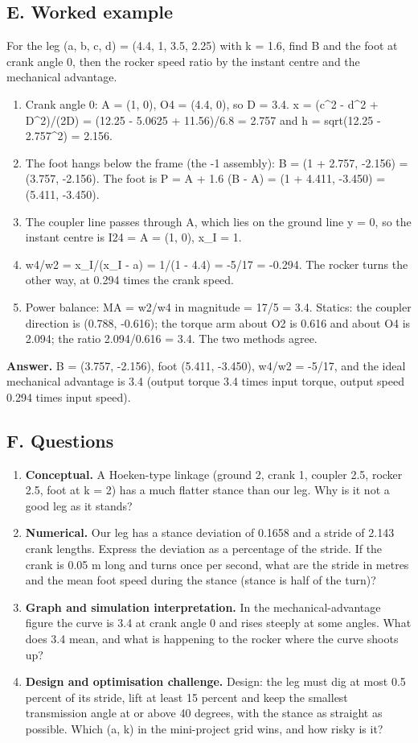 \documentclass[11pt,a4paper]{article}
\begin{document}
\subsection*{E. Worked example}
For the leg (a, b, c, d) = (4.4, 1, 3.5, 2.25) with k = 1.6, find B and the foot at crank angle 0, then the rocker speed ratio by the instant centre and the mechanical advantage.
\begin{enumerate}[nosep]
\item Crank angle 0: A = (1, 0), O4 = (4.4, 0), so D = 3.4. x = (c\textasciicircum{}2 - d\textasciicircum{}2 + D\textasciicircum{}2)/(2D) = (12.25 - 5.0625 + 11.56)/6.8 = 2.757 and h = sqrt(12.25 - 2.757\textasciicircum{}2) = 2.156.
\item The foot hangs below the frame (the -1 assembly): B = (1 + 2.757, -2.156) = (3.757, -2.156). The foot is P = A + 1.6 (B - A) = (1 + 4.411, -3.450) = (5.411, -3.450).
\item The coupler line passes through A, which lies on the ground line y = 0, so the instant centre is I24 = A = (1, 0), x\_I = 1.
\item w4/w2 = x\_I/(x\_I - a) = 1/(1 - 4.4) = -5/17 = -0.294. The rocker turns the other way, at 0.294 times the crank speed.
\item Power balance: MA = w2/w4 in magnitude = 17/5 = 3.4. Statics: the coupler direction is (0.788, -0.616); the torque arm about O2 is 0.616 and about O4 is 2.094; the ratio 2.094/0.616 = 3.4. The two methods agree.
\end{enumerate}
\textbf{Answer.} B = (3.757, -2.156), foot (5.411, -3.450), w4/w2 = -5/17, and the ideal mechanical advantage is 3.4 (output torque 3.4 times input torque, output speed 0.294 times input speed).

\subsection*{F. Questions}
\begin{enumerate}[nosep]
\item \textbf{Conceptual.} A Hoeken-type linkage (ground 2, crank 1, coupler 2.5, rocker 2.5, foot at k = 2) has a much flatter stance than our leg. Why is it not a good leg as it stands?
\item \textbf{Numerical.} Our leg has a stance deviation of 0.1658 and a stride of 2.143 crank lengths. Express the deviation as a percentage of the stride. If the crank is 0.05 m long and turns once per second, what are the stride in metres and the mean foot speed during the stance (stance is half of the turn)?
\item \textbf{Graph and simulation interpretation.} In the mechanical-advantage figure the curve is 3.4 at crank angle 0 and rises steeply at some angles. What does 3.4 mean, and what is happening to the rocker where the curve shoots up?
\item \textbf{Design and optimisation challenge.} Design: the leg must dig at most 0.5 percent of its stride, lift at least 15 percent and keep the smallest transmission angle at or above 40 degrees, with the stance as straight as possible. Which (a, k) in the mini-project grid wins, and how risky is it?
\end{enumerate}
\end{document}
